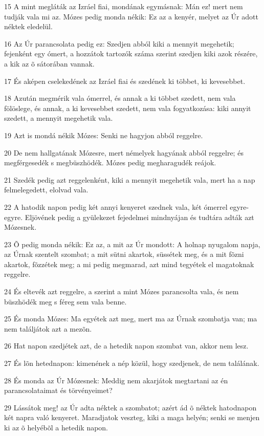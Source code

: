 \par 15 A mint megláták az Izráel fiai, mondának egymásnak: Mán ez! mert nem tudják vala mi az. Mózes pedig monda nékik: Ez az a kenyér, melyet az Úr adott néktek eledelül.
\par 16 Az Úr parancsolata pedig ez: Szedjen abból kiki a mennyit megehetik; fejenként egy ómert, a hozzátok tartozók száma szerint szedjen kiki azok részére, a kik az õ sátorában vannak.
\par 17 És aképen cselekedének az Izráel fiai és szedének ki többet, ki kevesebbet.
\par 18 Azután megmérik vala ómerrel, és annak a ki többet szedett, nem vala fölöslege, és annak, a ki kevesebbet szedett, nem vala fogyatkozása: kiki annyit szedett, a mennyit megehetik vala.
\par 19 Azt is mondá nékik Mózes: Senki ne hagyjon abból reggelre.
\par 20 De nem hallgatának Mózesre, mert némelyek hagyának abból reggelre; és megférgesedék s megbüszhödék. Mózes pedig megharagudék reájok.
\par 21 Szedék pedig azt reggelenként, kiki a mennyit megehetik vala, mert ha a nap felmelegedett, elolvad vala.
\par 22 A hatodik napon pedig két annyi kenyeret szednek vala, két ómerrel egyre-egyre. Eljövének pedig a gyülekezet fejedelmei mindnyájan és tudtára adták azt Mózesnek.
\par 23 Õ pedig monda nékik: Ez az, a mit az Úr mondott: A holnap nyugalom napja, az Úrnak szentelt szombat; a mit sütni akartok, süssétek meg, és a mit fõzni akartok, fõzzétek meg; a mi pedig megmarad, azt mind tegyétek el magatoknak reggelre.
\par 24 És eltevék azt reggelre, a szerint a mint Mózes parancsolta vala, és nem büszhödék meg s féreg sem vala benne.
\par 25 És monda Mózes: Ma egyétek azt meg, mert ma az Úrnak szombatja van; ma nem találjátok azt a mezõn.
\par 26 Hat napon szedjétek azt, de a hetedik napon szombat van, akkor nem lesz.
\par 27 És lõn hetednapon: kimenének a nép közül, hogy szedjenek, de nem találának.
\par 28 És monda az Úr Mózesnek: Meddig nem akarjátok megtartani az én parancsolataimat és törvényeimet?
\par 29 Lássátok meg! az Úr adta néktek a szombatot; azért ád õ néktek hatodnapon két napra való kenyeret. Maradjatok veszteg, kiki a maga helyén; senki se menjen ki az õ helyébõl a hetedik napon.
